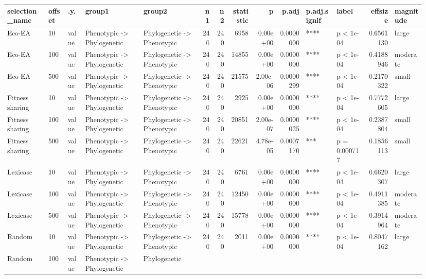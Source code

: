 \documentclass[]{book}
\begin{document}
\begin{table}
\centering
\begin{tabular}[t]{l|l|l|l|l|r|r|r|r|r|l|l|r|l}
\hline
selection\_name & offset & .y. & group1 & group2 & n1 & n2 & statistic & p & p.adj & p.adj.signif & label & effsize & magnitude\\
\hline
Eco-EA & 10 & value & Phenotypic
    ->
Phylogenetic & Phylogenetic
    ->
Phenotypic & 240 & 240 & 6958 & 0.00e+00 & 0.0000000 & **** & p < 1e-04 & 0.6561130 & large\\
\hline
Eco-EA & 100 & value & Phenotypic
    ->
Phylogenetic & Phylogenetic
    ->
Phenotypic & 240 & 240 & 14855 & 0.00e+00 & 0.0000000 & **** & p < 1e-04 & 0.4188946 & moderate\\
\hline
Eco-EA & 500 & value & Phenotypic
    ->
Phylogenetic & Phylogenetic
    ->
Phenotypic & 240 & 240 & 21575 & 2.00e-06 & 0.0000299 & **** & p < 1e-04 & 0.2170322 & small\\
\hline
Fitness sharing & 10 & value & Phenotypic
    ->
Phylogenetic & Phylogenetic
    ->
Phenotypic & 240 & 240 & 2925 & 0.00e+00 & 0.0000000 & **** & p < 1e-04 & 0.7772605 & large\\
\hline
Fitness sharing & 100 & value & Phenotypic
    ->
Phylogenetic & Phylogenetic
    ->
Phenotypic & 240 & 240 & 20851 & 2.00e-07 & 0.0000025 & **** & p < 1e-04 & 0.2387804 & small\\
\hline
Fitness sharing & 500 & value & Phenotypic
    ->
Phylogenetic & Phylogenetic
    ->
Phenotypic & 240 & 240 & 22621 & 4.78e-05 & 0.0007170 & *** & p = 0.000717 & 0.1856113 & small\\
\hline
Lexicase & 10 & value & Phenotypic
    ->
Phylogenetic & Phylogenetic
    ->
Phenotypic & 240 & 240 & 6761 & 0.00e+00 & 0.0000000 & **** & p < 1e-04 & 0.6620307 & large\\
\hline
Lexicase & 100 & value & Phenotypic
    ->
Phylogenetic & Phylogenetic
    ->
Phenotypic & 240 & 240 & 12450 & 0.00e+00 & 0.0000000 & **** & p < 1e-04 & 0.4911385 & moderate\\
\hline
Lexicase & 500 & value & Phenotypic
    ->
Phylogenetic & Phylogenetic
    ->
Phenotypic & 240 & 240 & 15778 & 0.00e+00 & 0.0000000 & **** & p < 1e-04 & 0.3914964 & moderate\\
\hline
Random & 10 & value & Phenotypic
    ->
Phylogenetic & Phylogenetic
    ->
Phenotypic & 240 & 240 & 2011 & 0.00e+00 & 0.0000000 & **** & p < 1e-04 & 0.8047162 & large\\
\hline
Random & 100 & value & Phenotypic
    ->
Phylogenetic & Phylogenetic

\end{tabular}
\end{table}
\end{document}
